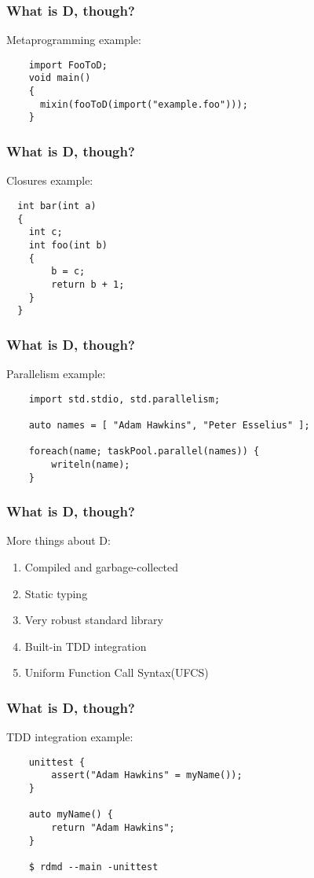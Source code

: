 \documentclass{beamer}
\begin{document}
\begin{frame}[fragile]
  \frametitle{What is D, though?}
  Metaprogramming example:
  \begin{verbatim}
    import FooToD;
    void main()
    {
      mixin(fooToD(import("example.foo")));
    }
  \end{verbatim}
\end{frame}

\begin{frame}[fragile]
  \frametitle{What is D, though?}
  Closures example:
  \begin{verbatim}
  int bar(int a)
  {
    int c;
    int foo(int b)
    {
        b = c;
        return b + 1;
    }
  }
  \end{verbatim}
\end{frame}

\begin{frame}[fragile]
  \frametitle{What is D, though?}
  Parallelism example:
  \begin{verbatim}
    import std.stdio, std.parallelism;

    auto names = [ "Adam Hawkins", "Peter Esselius" ];

    foreach(name; taskPool.parallel(names)) {
        writeln(name);
    }
\end{verbatim}
\end{frame}

\begin{frame}
  \frametitle{What is D, though?}
  More things about D:
  \begin{enumerate}
    \item<1-> Compiled and garbage-collected
    \item<2-> Static typing
    \item<3-> Very robust standard library
    \item<4-> Built-in TDD integration
    \item<5-> Uniform Function Call Syntax(UFCS)
  \end{enumerate}
\end{frame}

\begin{frame}[fragile]
  \frametitle{What is D, though?}
  TDD integration example:
  \begin{verbatim}
    unittest {
        assert("Adam Hawkins" = myName());
    }

    auto myName() {
        return "Adam Hawkins";
    }

    $ rdmd --main -unittest
  \end{verbatim}
\end{frame}
\end{document}
